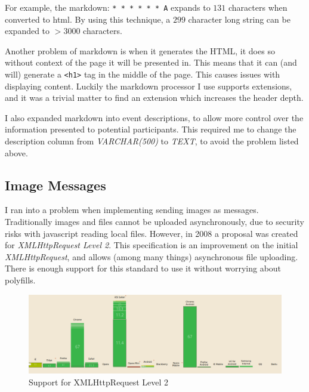\documentclass[a4paper,oneside,12pt]{report}
\begin{document}
	\begin{framed}
		For example, the markdown: \verb+* * * * * * A+ expands to \(131\) characters when converted to html. By using this technique, a \(299\) character long string can be expanded to \(> 3000\) characters.
	\end{framed}

	\lstset{language=html}
	Another problem of markdown is when it generates the HTML, it does so without context of the page it will be presented in. This means that it can (and will) generate a \lstinline|<h1>| tag in the middle of the page. This causes issues with displaying content. Luckily the markdown processor I use supports extensions, and it was a trivial matter to find an extension which increases the header depth.

	I also expanded markdown into event descriptions, to allow more control over the information presented to potential participants. This required me to change the description column from  \textit{VARCHAR(500)} to \textit{TEXT}, to avoid the problem listed above.


	\subsection{Image Messages}
	I ran into a problem when implementing sending images as messages. Traditionally images and files cannot be uploaded asynchronously, due to security risks with javascript reading local files. However, in 2008 a proposal was created for \textit{XMLHttpRequest Level 2}. This specification is an improvement on the initial \textit{XMLHttpRequest}, and allows (among many things) asynchronous file uploading. There is enough support for this standard to use it without worrying about polyfills.

	\begin{figure}[H]
		\caption{Support for XMLHttpRequest Level 2}
		\includegraphics[width=\linewidth]{static/xmlhttp2support.png}
	\end{figure}

\end{document}
